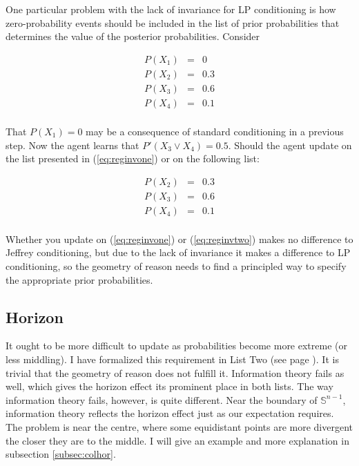 \documentclass[11pt]{article}
\begin{document}
One particular problem with the lack of invariance for LP conditioning
is how zero-probability events should be included in the list of prior
probabilities that determines the value of the posterior
probabilities. Consider

\begin{equation}
  \label{eq:reginvone}
  \begin{array}{rcl}
    P(X_{1})&=&0\\
    P(X_{2})&=&0.3\\
    P(X_{3})&=&0.6\\
    P(X_{4})&=&0.1\\
  \end{array}
\end{equation}

That $P(X_{1})=0$ may be a consequence of standard conditioning in a
previous step. Now the agent learns that $P'(X_{3}\vee{}X_{4})=0.5$.
Should the agent update on the list presented in (\ref{eq:reginvone})
or on the following list:

\begin{equation}
  \label{eq:reginvtwo}
  \begin{array}{rcl}
    P(X_{2})&=&0.3\\
    P(X_{3})&=&0.6\\
    P(X_{4})&=&0.1\\
  \end{array}
\end{equation}

Whether you update on (\ref{eq:reginvone}) or (\ref{eq:reginvtwo})
makes no difference to Jeffrey conditioning, but due to the lack of
invariance it makes a difference to LP conditioning, so the geometry
of reason needs to find a principled way to specify the appropriate
prior probabilities. 

\subsection{Horizon}
\label{Horizon}

It ought to be more difficult to update as probabilities become more
extreme (or less middling). I have formalized this requirement in List
Two (see page \pageref{page:listtwo}). It is trivial that the geometry
of reason does not fulfill it. Information theory fails as well, which
gives the horizon effect its prominent place in both lists. The way
information theory fails, however, is quite different. Near the
boundary of $\mathbb{S}^{n-1}$, information theory reflects the
horizon effect just as our expectation requires. The problem is near
the centre, where some equidistant points are more divergent the
closer they are to the middle. I will give an example and more
explanation in subsection \ref{subsec:colhor}.
\end{document}
